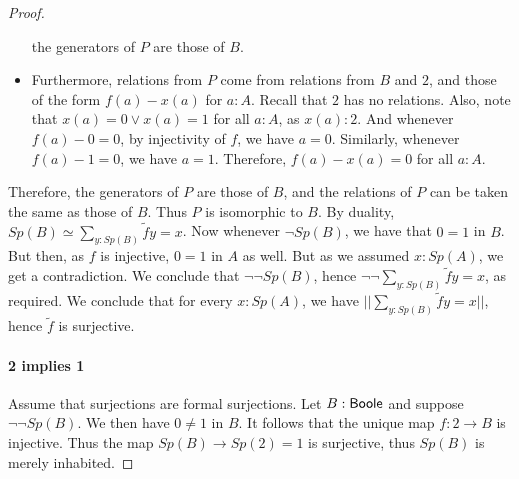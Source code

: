 \begin{proof}
\begin{itemize}
  the generators of $P$ are those of $B$. 
    \item 
  Furthermore, relations from $P$ come from relations from $B$ and $2$, and those of the form $f(a) - x(a)$ for $a:A$.
    Recall that $2$ has no relations. Also, 
    note that $x(a)= 0 \vee x(a) = 1$ for all $a:A$, as $x(a):2$. 
  And whenever $f(a) - 0 = 0$, by injectivity of $f$, we have $a=0$. 
  Similarly, whenever $f(a) - 1 = 0$, we have $a=1$. 
  Therefore, $f(a) -x(a) = 0 $ for all $a:A$. 
  \end{itemize} 
Therefore, the generators of $P$ are those of $B$, and the relations of $P$ can be taken the same as those of $B$. 
Thus $P$ is isomorphic to $B$. By duality, $Sp(B) \simeq \sum\limits_{y:Sp(B)} \tilde f y = x $. 
Now whenever $\neg Sp(B)$, we have that $0=1$ in $B$. But then, as $f$ is injective, $0=1$ in $A$ as well. 
But as we assumed $x:Sp(A)$, we get a contradiction. 
We conclude that $\neg \neg Sp(B)$, hence $\neg \neg \sum\limits_{y:Sp(B)} \tilde f y = x $, as required. 
We conclude that for every $x:Sp(A)$, we have $||\sum\limits_{y:Sp(B)} \tilde f y = x ||$, hence $\tilde f$ is surjective. 


\item\paragraph{2 implies 1}
  Assume that surjections are formal surjections. 
  Let $B:\mathsf{Boole}$ and suppose $\neg \neg Sp(B)$. 
  We then have $0\neq 1$ in $B$. 
  It follows that the unique map $f:2\to B$ is injective. 
  Thus the map $Sp(B) \to Sp(2) = 1$ is surjective, thus $Sp(B)$ is merely inhabited. 

\end{proof}
 


